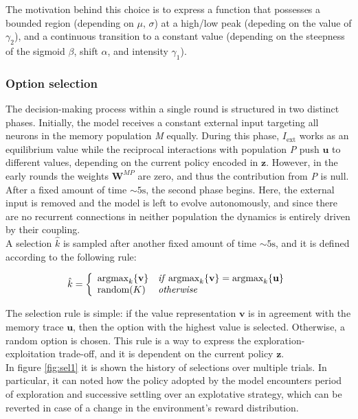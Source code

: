 \noindent The motivation behind this choice is to express a function that possesses a bounded region (depending on $\mu,\,\sigma$) at a high/low peak (depeding on the value of $\gamma_{2}$), and a continuous transition to a constant value (depending on the steepness of the sigmoid $\beta$, shift
$\alpha$, and intensity $\gamma_{1}$).

\subsubsection{Option selection}
The decision-making process within a single round is structured in two distinct phases. Initially, the model receives a constant external input targeting all neurons in the memory population \textit{M} equally.
During this phase, $I_{\text{ext}}$ works as an equilibrium value while the reciprocal interactions with population \textit{P} push $\textbf{u}$ to different values, depending on the current policy encoded in $\textbf{z}$. However, in the early rounds the weights $\textbf{W}^{MP}$ are zero, and thus
the contribution from \textit{P} is null. After a fixed amount of time $\sim 5 \text{s}$, the second phase begins. Here, the external input is removed and the model is left to evolve autonomously, and since there are no recurrent connections in neither population the dynamics is entirely driven by their coupling. \\
A selection $\hat{k}$ is sampled after another fixed amount of time $\sim 5 \text{s}$, and it is defined according to the following rule:

\begin{equation*}
    \hat{k} =
    \left\{
        \begin{array}{ll}
            \text{argmax}_{k}\{\textbf{v}\} & \text{\textit{if}}\; \text{argmax}_{k} \{\textbf{v}\} = \text{argmax}_{k} \{\textbf{u}\} \\
            \text{random}(K) & \text{\textit{otherwise}}
        \end{array}
    \right.
\end{equation*}

\noindent The selection rule is simple: if the value representation $\textbf{v}$ is in agreement with the memory trace $\textbf{u}$, then the option with the highest value is selected. Otherwise, a random option is chosen. This rule is a way to express the exploration-exploitation trade-off, and it
is dependent on the current policy $\textbf{z}$. \\ In figure \ref{fig:sel1} it is shown the history of selections over multiple trials. In particular, it can noted how the policy adopted by the model encounters period of exploration and successive settling over an explotative strategy, which can be
reverted in case of a change in the environment's reward distribution.

